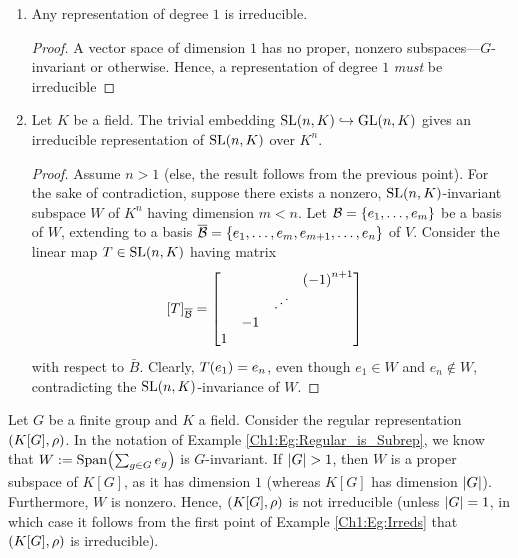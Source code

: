 \begin{boxexample} \label{Ch1:Eg:Irreds}
    \hfill
    \begin{enumerate}
        \item Any representation of degree $1$ is irreducible.
        \begin{proof}
            A vector space of dimension $1$ has no proper, nonzero subspaces---$G$-invariant or otherwise. Hence, a representation of degree $1$ \textit{must} be irreducible
        \end{proof}
        \item Let $K$ be a field. The trivial embedding $\operatorname{SL}\!\left( n,K \right) \hookrightarrow \operatorname{GL}\!\left( n,K \right)$ gives an irreducible representation of $\operatorname{SL}\!\left( n,K \right)$ over $K^n$.
        \begin{proof}
            Assume $n > 1$ (else, the result follows from the previous point). For the sake of contradiction, suppose there exists a nonzero, $\operatorname{SL}\!\left( n,K \right)$-invariant subspace $W$ of $K^n$ having dimension $m < n$. Let $\mathcal{B} = \left\{ e_1, \ldots, e_m \right\}$ be a basis of $W$, extending to a basis $\overline{\mathcal{B}} = \left\{ e_1, \ldots, e_m, e_{m+1}, \ldots, e_n \right\}$ of $V$. Consider the linear map $T \in \operatorname{SL}\!\left( n,K \right)$ having matrix
            \begin{align*}
                \left[ T \right]_{\overline{\mathcal{B}}} &=
                \begin{bmatrix}
                    & & & \left( -1 \right)^{n+1} \\
                    & & \iddots & \\
                    & -1 & & \\
                    1 & & &
                \end{bmatrix}
            \end{align*}
            with respect to $\bar{B}$. Clearly, $T\!\left( e_1 \right) = e_n$, even though $e_1 \in W$ and $e_n \notin W$, contradicting the $\operatorname{SL}\!\left( n,K \right)$-invariance of $W$.
        \end{proof}
    \end{enumerate}
\end{boxexample}
\begin{boxnexample}
    Let $G$ be a finite group and $K$ a field. Consider the regular representation $\left( K[G], \rho \right)$. In the notation of Example \ref{Ch1:Eg:Regular_is_Subrep}, we know that $W := \operatorname{Span}\!\left( \sum_{g \in G} e_g \right)$ is $G$-invariant. If $\left\lvert G \right\rvert > 1$, then $W$ is a proper subspace of $K[G]$, as it has dimension $1$ (whereas $K[G]$ has dimension $\left\lvert G \right\rvert$). Furthermore, $W$ is nonzero. Hence, $\left( K[G], \rho \right)$ is not irreducible (unless $\left\lvert G \right\rvert = 1$, in which case it follows from the first point of Example \ref{Ch1:Eg:Irreds} that $\left( K[G], \rho \right)$ is irreducible).
\end{boxnexample}


